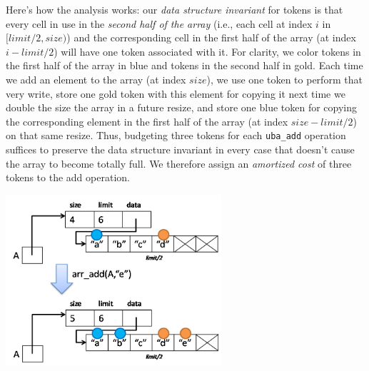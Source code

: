 
Here's how the analysis works: our \emph{data structure invariant} for
tokens is that every cell in use in the \emph{second half of the
  array} (i.e., each cell at index $i$ in $\lbrack \mathit{limit}/2,
\mathit{size})$) and the corresponding cell in the first half of the
array (at index $i - \mathit{limit}/2$) will have one token associated
with it.  For clarity, we color tokens in the first half of the array
in blue and tokens in the second half in gold.
Each time we add an element to the array (at index
$\mathit{size}$), we use one token to perform that very write, store
one gold token with this element for copying it next time we double the
size the array in a future resize, and store one blue token for copying the
corresponding element in the first half of the array (at index
$\mathit{size} - \mathit{limit}/2$) on that same resize.  Thus,
budgeting three tokens for each \lstinline'uba_add' operation suffices
to preserve the data structure invariant in every case that doesn't
cause the array to become totally full.  We therefore assign an
\emph{amortized cost} of three tokens to the add operation.
\begin{center}
\includegraphics[width=0.6\textwidth]{img/tokenB.png}
\end{center}

